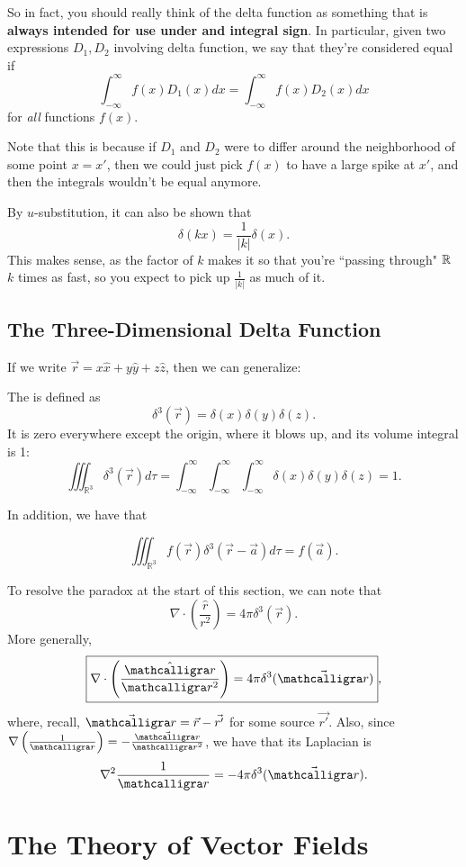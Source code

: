 So in fact, you should really think of the delta function as something that is \textbf{always intended for use under and integral sign}. In particular, given two expressions $D_1, D_2$ involving delta function, we say that they're considered equal if
\[\int_{-\infty}^\infty f(x)D_1(x)dx=\int_{-\infty}^\infty f(x)D_2(x)dx\]
for \textit{all} functions $f(x)$.

Note that this is because if $D_1$ and $D_2$ were to differ around the neighborhood of some point $x=x'$, then we could just pick $f(x)$ to have a large spike at $x'$, and then the integrals wouldn't be equal anymore.

By $u$-substitution, it can also be shown that
\[\delta(kx)=\frac{1}{|k|}\delta(x).\]
This makes sense, as the factor of $k$ makes it so that you're ``passing through" $\mathbb R$ $k$ times as fast, so you expect to pick up $\frac{1}{|k|}$ as much of it.

\subsection{The Three-Dimensional Delta Function}

If we write $\vec{r}=x\hat{x}+y\hat{y}+z\hat{z}$, then we can generalize:

\begin{definition}
    The  is defined as
    \[\delta^3(\vec{r})=\delta(x)\delta(y)\delta(z).\]
    It is zero everywhere except the origin, where it blows up, and its volume integral is 1:
    \[\iiint_{\mathbb{R}^3}\delta^3(\vec{r})d\tau=\int_{-\infty}^\infty\int_{-\infty}^\infty\int_{-\infty}^\infty\delta(x)\delta(y)\delta(z)=1.\]
\end{definition}

In addition, we have that

\[\boxed{\iiint_{\mathbb{R}^3}f(\vec{r})\delta^3(\vec{r}-\vec{a})d\tau=f(\vec{a})}.\]

To resolve the paradox at the start of this section, we can note that
\[\nabla\cdot\left(\frac{\hat{r}}{r^2}\right)=4\pi\delta^3(\vec{r}).\]
More generally,
\[\boxed{\nabla\cdot\left(\frac{\hat{\scr}}{\scr^2}\right)=4\pi\delta^3(\vec{\scr})},\]
where, recall, $\vec{\scr}=\vec{r}-\vec{r'}$ for some source $\vec{r'}$. Also, since $\nabla\left(\frac{1}{\scr}\right)=-\frac{\vec{\scr}}{\scr^2}$, we have that its Laplacian is
\[\nabla^2\frac{1}{\scr}=-4\pi\delta^3(\vec{\scr}).\]

\section{The Theory of Vector Fields}


